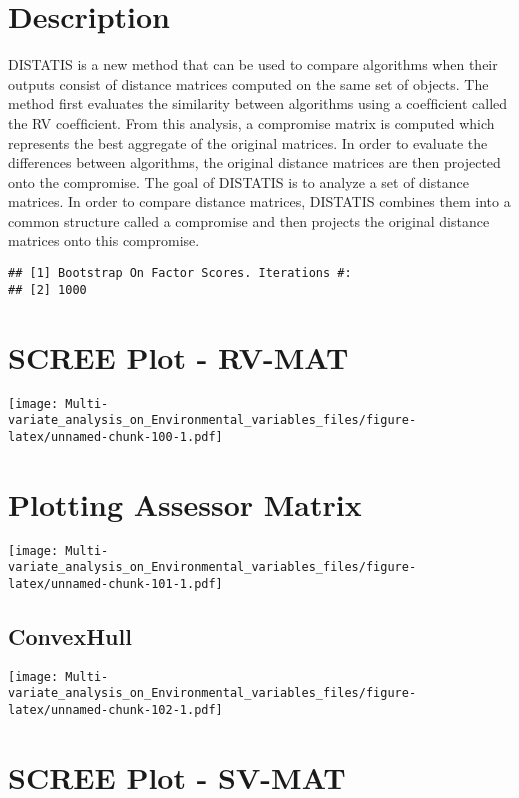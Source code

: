 \documentclass[]{book}
\begin{document}
\hypertarget{description-6}{%
\section{Description}\label{description-6}}

DISTATIS is a new method that can be used to compare algorithms when
their outputs consist of distance matrices computed on the same set of
objects. The method ﬁrst evaluates the similarity between algorithms
using a coefﬁcient called the RV coefﬁcient. From this analysis, a
compromise matrix is computed which represents the best aggregate of the
original matrices. In order to evaluate the differences between
algorithms, the original distance matrices are then projected onto the
compromise. The goal of DISTATIS is to analyze a set of distance
matrices. In order to compare distance matrices, DISTATIS combines them
into a common structure called a compromise and then projects the
original distance matrices onto this compromise.

\begin{verbatim}
## [1] Bootstrap On Factor Scores. Iterations #: 
## [2] 1000
\end{verbatim}

\hypertarget{scree-plot---rv-mat}{%
\section{SCREE Plot - RV-MAT}\label{scree-plot---rv-mat}}

\texttt{[image: Multi-variate\_analysis\_on\_Environmental\_variables\_files/figure-latex/unnamed-chunk-100-1.pdf]}

\hypertarget{plotting-assessor-matrix}{%
\section{Plotting Assessor Matrix}\label{plotting-assessor-matrix}}

\texttt{[image: Multi-variate\_analysis\_on\_Environmental\_variables\_files/figure-latex/unnamed-chunk-101-1.pdf]}

\hypertarget{convexhull}{%
\subsection{ConvexHull}\label{convexhull}}

\texttt{[image: Multi-variate\_analysis\_on\_Environmental\_variables\_files/figure-latex/unnamed-chunk-102-1.pdf]}

\hypertarget{scree-plot---sv-mat}{%
\section{SCREE Plot - SV-MAT}\label{scree-plot---sv-mat}}
\end{document}
